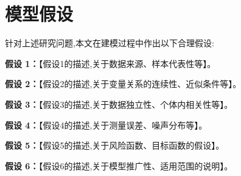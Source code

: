 
\section{模型假设}

针对上述研究问题,本文在建模过程中作出以下合理假设:

\textbf{假设 1：}【假设1的描述,关于数据来源、样本代表性等】。

\textbf{假设 2：}【假设2的描述,关于变量关系的连续性、近似条件等】。

\textbf{假设 3：}【假设3的描述,关于数据独立性、个体内相关性等】。

\textbf{假设 4：}【假设4的描述,关于测量误差、噪声分布等】。

\textbf{假设 5：}【假设5的描述,关于风险函数、目标函数的假设】。

\textbf{假设 6：}【假设6的描述,关于模型推广性、适用范围的说明】。
